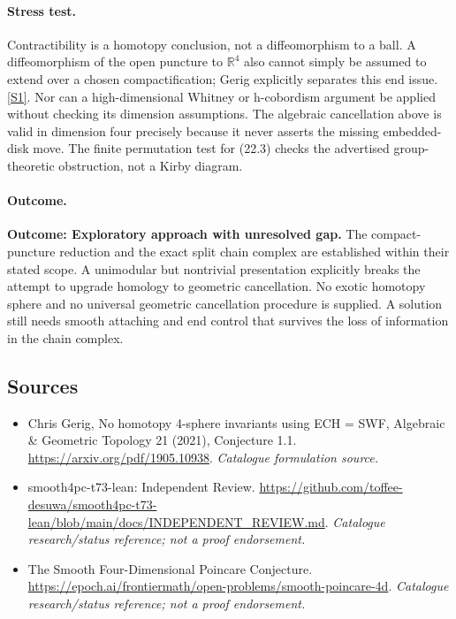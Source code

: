 \documentclass[11pt,a4paper]{article}
\newcommand{\R}{\mathbb{R}}
\newcommand{\sref}[2]{\hyperlink{source:#1:#2}{[S#2]}}
\begin{document}
\paragraph{Stress test.}
Contractibility is a homotopy conclusion, not a diffeomorphism to a ball.
A diffeomorphism of the open puncture to $\R^4$ also cannot simply be
assumed to extend over a chosen compactification; Gerig explicitly
separates this end issue. \sref{statement}{1}.
Nor can a high-dimensional Whitney or h-cobordism argument be applied
without checking its dimension assumptions. The algebraic cancellation
above is valid in dimension four precisely because it never asserts the
missing embedded-disk move. The finite permutation test for (22.3)
checks the advertised group-theoretic obstruction, not a Kirby diagram.

\paragraph{Outcome.}
\textbf{Outcome: Exploratory approach with unresolved gap.}
The compact-puncture reduction and the exact split chain complex are
established within their stated scope. A unimodular but nontrivial
presentation explicitly breaks the attempt to upgrade homology to
geometric cancellation. No exotic homotopy sphere and no universal
geometric cancellation procedure is supplied. A solution still needs
smooth attaching and end control that survives the loss of information
in the chain complex.
\subsection{Sources}
\begin{itemize}\raggedright
\item[\textnormal{[S1]}]\hypertarget{source:statement:1}{} Chris Gerig, No homotopy 4-sphere invariants using ECH = SWF, Algebraic \& Geometric Topology 21 (2021), Conjecture 1.1.
\url{https://arxiv.org/pdf/1905.10938}.
{\small\textit{Catalogue formulation source.}}
\item[\textnormal{[S2]}]\hypertarget{source:statement:2}{} smooth4pc-t73-lean: Independent Review.
\url{https://github.com/toffee-desuwa/smooth4pc-t73-lean/blob/main/docs/INDEPENDENT_REVIEW.md}.
{\small\textit{Catalogue research/status reference; not a proof endorsement.}}
\item[\textnormal{[S3]}]\hypertarget{source:statement:3}{} The Smooth Four-Dimensional Poincare Conjecture.
\url{https://epoch.ai/frontiermath/open-problems/smooth-poincare-4d}.
{\small\textit{Catalogue research/status reference; not a proof endorsement.}}
\end{itemize}

\end{document}
